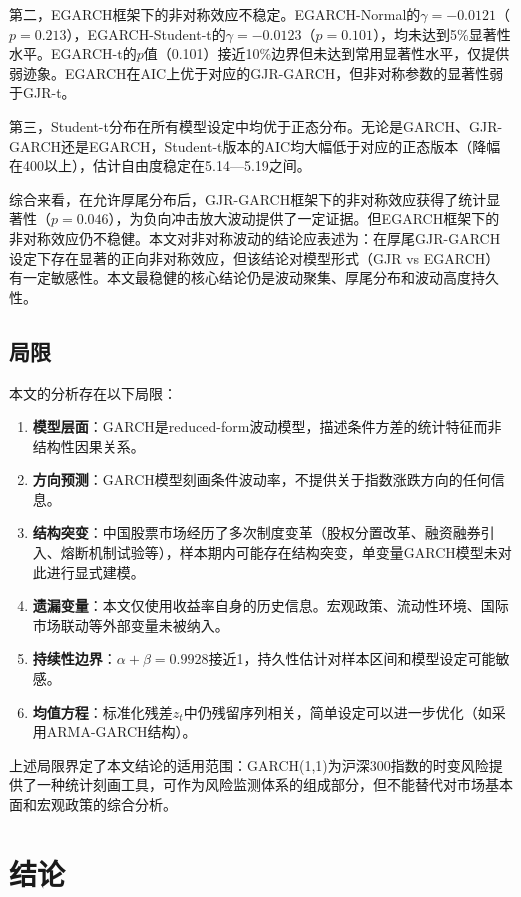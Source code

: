 \documentclass[11pt,a4paper]{article}
\begin{document}
第二，EGARCH框架下的非对称效应不稳定。EGARCH-Normal的\(\gamma=-0.0121\)（\(p=0.213\)），EGARCH-Student-t的\(\gamma=-0.0123\)（\(p=0.101\)），均未达到5\%显著性水平。EGARCH-t的\(p\)值（0.101）接近10\%边界但未达到常用显著性水平，仅提供弱迹象。EGARCH在AIC上优于对应的GJR-GARCH，但非对称参数的显著性弱于GJR-t。

第三，Student-t分布在所有模型设定中均优于正态分布。无论是GARCH、GJR-GARCH还是EGARCH，Student-t版本的AIC均大幅低于对应的正态版本（降幅在400以上），估计自由度稳定在5.14—5.19之间。

综合来看，在允许厚尾分布后，GJR-GARCH框架下的非对称效应获得了统计显著性（\(p=0.046\)），为负向冲击放大波动提供了一定证据。但EGARCH框架下的非对称效应仍不稳健。本文对非对称波动的结论应表述为：在厚尾GJR-GARCH设定下存在显著的正向非对称效应，但该结论对模型形式（GJR vs EGARCH）有一定敏感性。本文最稳健的核心结论仍是波动聚集、厚尾分布和波动高度持久性。

\subsection{局限}

本文的分析存在以下局限：

\begin{enumerate}[nosep]
\item \textbf{模型层面}：GARCH是reduced-form波动模型，描述条件方差的统计特征而非结构性因果关系。
\item \textbf{方向预测}：GARCH模型刻画条件波动率，不提供关于指数涨跌方向的任何信息。
\item \textbf{结构突变}：中国股票市场经历了多次制度变革（股权分置改革、融资融券引入、熔断机制试验等），样本期内可能存在结构突变，单变量GARCH模型未对此进行显式建模。
\item \textbf{遗漏变量}：本文仅使用收益率自身的历史信息。宏观政策、流动性环境、国际市场联动等外部变量未被纳入。
\item \textbf{持续性边界}：\(\alpha+\beta=0.9928\)接近1，持久性估计对样本区间和模型设定可能敏感。
\item \textbf{均值方程}：标准化残差\(z_t\)中仍残留序列相关，简单设定可以进一步优化（如采用ARMA-GARCH结构）。
\end{enumerate}

上述局限界定了本文结论的适用范围：GARCH(1,1)为沪深300指数的时变风险提供了一种统计刻画工具，可作为风险监测体系的组成部分，但不能替代对市场基本面和宏观政策的综合分析。

\section{结论}
\end{document}
